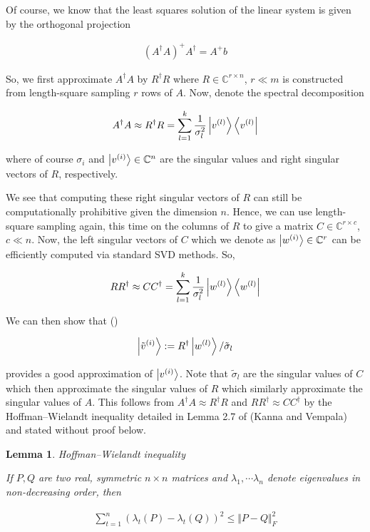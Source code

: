 \documentclass[11pt]{article}
\newcommand\0{\mathbf{0}}
\newcommand\CC{\mathbb{C}}
\newcommand\<{\langle}
\renewcommand\>{\rangle}
\newtheorem{lemma}[theorem]{Lemma}
\begin{document}
Of course, we know that the least squares solution of the linear system is given by the orthogonal projection

\begin{align*}
	(A^\dag A)^+ A^\dag = A^+ b
\end{align*}

So, we first approximate $A^\dag A$ by $R^\dag R$ where $R \in \CC^{r \times n}$, $r \ll m$ is constructed from length-square sampling $r$ rows of $A$. Now, denote the spectral decomposition 

\begin{align*}
A^\dag A \approx R^\dag R = \sum_{l=1}^k \frac{1}{\sigma_l^2}\ket{v^{(l)}}\bra{v^{(l)}}
\end{align*}

where of course $\sigma_i$ and $\ket{v^{(i)}} \in \CC^n$ are the singular values and right singular vectors of $R$, respectively.

We see that computing these right singular vectors of $R$ can still be computationally prohibitive given the dimension $n$. Hence, we can use length-square sampling again, this time on the columns of $R$ to give a matrix $C \in \CC^{r \times c}$, $c \ll n$. Now, the left singular vectors of $C$ which we denote as $\ket{w^{(i)}} \in \CC^r$ can be efficiently computed via standard SVD methods. So,

\begin{align*}
RR^\dag \approx CC^\dag = \sum_{l=1}^k \frac{1}{\sigma_l^2}\ket{w^{(l)}}\bra{w^{(l)}}
\end{align*}


We can then show that ()

\begin{align}
\label{def:approx-right}
\ket{\tilde{v}^{(i)}} := R^\dag \ket{w^{(l)}} / \tilde{\sigma}_l
\end{align}

provides a good approximation of $\ket{v^{(i)}}$. Note that $\tilde{\sigma}_l$ are the singular values of $C$ which then approximate the singular values of $R$ which similarly approximate the singular values of $A$. This follows from $A^\dag A \approx R^\dag R$ and $RR^\dag \approx CC^\dag$ by the Hoffman--Wielandt inequality detailed in Lemma 2.7 of (Kanna and Vempala) and stated without proof below.

\begin{lemma}Hoffman--Wielandt inequality

	If $P, Q$ are two real, symmetric $n \times n$ matrices and $\lambda_1, \cdots \lambda_n$ denote eigenvalues in non-decreasing order, then
	
	\begin{align*}
		\sum_{t=1}^n(\lambda_t(P) - \lambda_t(Q))^2 \leq \Vert P - Q \Vert_F^2
	\end{align*}
\end{lemma}
\end{document}
